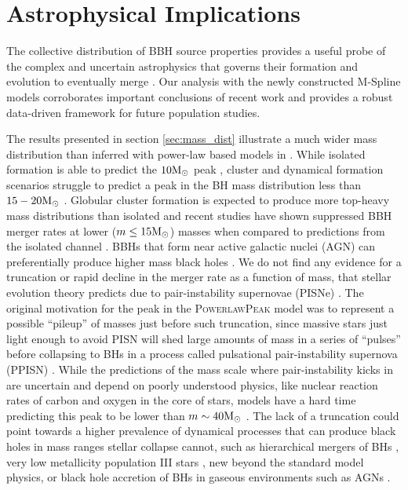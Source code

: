 \section{Astrophysical Implications}\label{sec:astrodiscussion}

The collective distribution of BBH source properties provides a useful probe of the complex and uncertain astrophysics that governs their 
formation and evolution to eventually merge \citep{Zevin_2017}. Our analysis with the newly constructed M-Spline models corroborates important 
conclusions of recent work and provides a robust data-driven framework for future population studies. 

The results presented in section \ref{sec:mass_dist} illustrate a much wider mass distribution than inferred with power-law based models in \citet{o3b_astro_dist}. 
While isolated formation is able to predict the $10{\rm M}_\odot$ peak , cluster and dynamical formation scenarios struggle to predict a peak in the BH mass distribution less than 
$15-20{\rm M}_\odot$ . Globular cluster formation is expected to produce more top-heavy mass distributions than isolated and recent studies have shown suppressed BBH merger rates 
at lower ($m\leq15{\rm M}_\odot$) masses when compared to predictions from the isolated channel . BBHs that form near active galactic nuclei (AGN) can preferentially produce higher 
mass black holes . We do not find any evidence for a truncation or rapid decline in the merger rate as a function of mass, that stellar evolution theory predicts 
due to pair-instability supernovae (PISNe) \citep{Heger_2002,PISN_Woosley,Heger_2003,Spera_2017}. The original motivation for the peak in the \textsc{PowerlawPeak} model \citep{Talbot_2018} was to represent a possible ``pileup'' of 
masses just before such truncation, since massive stars just light enough to avoid PISN will shed large amounts of mass in a series of ``pulses'' before collapsing to BHs in a process called 
pulsational pair-instability supernova (PPISN) \citep{Woosley_2017,Woosley_2019,Farmer_2019}. While the predictions of the mass scale where pair-instability kicks in are uncertain and depend on poorly understood physics, 
like nuclear reaction rates of carbon and oxygen in the core of stars, models have a hard time predicting this peak to be lower than $m\sim40{\rm M}_\odot$ \citep{Belczynski_2016,Marchant_2019,Renzo_2020,Farmer_2019,Farmer_2020}. The lack of a truncation could 
point towards a higher prevalence of dynamical processes that can produce black holes in mass ranges stellar collapse cannot, such as hierarchical mergers of BHs \citep{Fishbach_2017,Doctor_2020,Kimball_genealogy,kimball2020evidence,doctor2021black,Fishbach_2022}, 
very low metallicity population III stars \citep{Belczynski_2020,Farrell_2020}, new beyond the standard model physics\citep{Croon_newphysics,Sakstein_2020}, or black hole accretion of BHs in gaseous environments such as AGNs \citep{Secunda_2020,McKernan_2020,cruzosorio2021gw190521}. 

